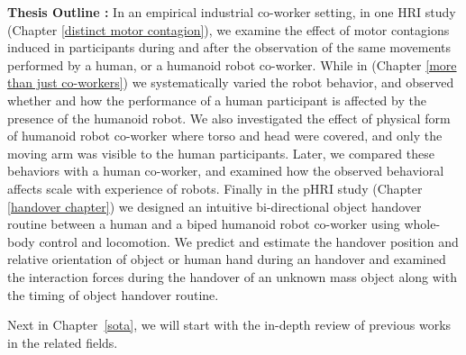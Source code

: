 \textbf{Thesis Outline :} In an empirical industrial co-worker setting, in one HRI study (Chapter \ref{distinct motor contagion}), we examine the effect of motor contagions induced in participants during and after the observation of the same movements performed by a human, or a humanoid robot co-worker. While in (Chapter \ref{more than just co-workers}) we systematically varied the robot behavior, and observed whether and how the performance of a human participant is affected by the presence of the humanoid robot. We also investigated the effect of physical form of humanoid robot co-worker where torso and head were covered, and only the moving arm was visible to the human participants. Later, we compared these behaviors with a human co-worker, and examined how the observed behavioral affects scale with experience of robots. Finally in the pHRI study (Chapter \ref{handover chapter}) we designed an intuitive bi-directional object handover routine between a human and a biped humanoid robot co-worker using whole-body control and locomotion. We predict and estimate the handover position and relative orientation of object or human hand during an handover and examined the interaction forces during the handover of an unknown mass object along with the timing of object handover routine.

Next in Chapter~\ref{sota}, we will start with the in-depth review of previous works in the related fields.



\clearpage %
\pagestyle{fancy}
